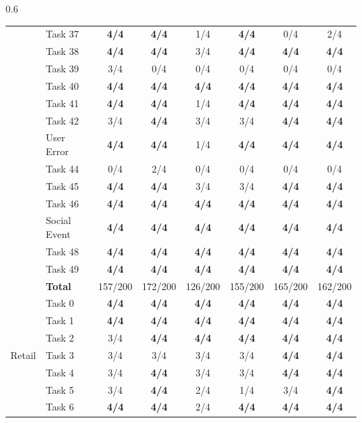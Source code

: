 \begin{table}[t]
\begin{subtable}[t]{0.6\textwidth}
\begin{tabular}{@{}llcccccc@{}}
 & Task 37 & \textbf{4/4} & \textbf{4/4} & 1/4 & \textbf{4/4} & 0/4 & 2/4 \\
 & Task 38 & \textbf{4/4} & \textbf{4/4} & 3/4 & \textbf{4/4} & \textbf{4/4} & \textbf{4/4} \\
 & Task 39 & 3/4 & 0/4 & 0/4 & 0/4 & 0/4 & 0/4 \\
 & Task 40 & \textbf{4/4} & \textbf{4/4} & \textbf{4/4} & \textbf{4/4} & \textbf{4/4} & \textbf{4/4} \\
 & Task 41 & \textbf{4/4} & \textbf{4/4} & 1/4 & \textbf{4/4} & \textbf{4/4} & \textbf{4/4} \\
 & Task 42 & 3/4 & \textbf{4/4} & 3/4 & 3/4 & \textbf{4/4} & \textbf{4/4} \\
 & User Error & \textbf{4/4} & \textbf{4/4} & 1/4 & \textbf{4/4} & \textbf{4/4} & \textbf{4/4} \\
 & Task 44 & 0/4 & 2/4 & 0/4 & 0/4 & 0/4 & 0/4 \\
 & Task 45 & \textbf{4/4} & \textbf{4/4} & 3/4 & 3/4 & \textbf{4/4} & \textbf{4/4} \\
 & Task 46 & \textbf{4/4} & \textbf{4/4} & \textbf{4/4} & \textbf{4/4} & \textbf{4/4} & \textbf{4/4} \\
 & Social Event & \textbf{4/4} & \textbf{4/4} & \textbf{4/4} & \textbf{4/4} & \textbf{4/4} & \textbf{4/4} \\
 & Task 48 & \textbf{4/4} & \textbf{4/4} & \textbf{4/4} & \textbf{4/4} & \textbf{4/4} & \textbf{4/4} \\
 & Task 49 & \textbf{4/4} & \textbf{4/4} & \textbf{4/4} & \textbf{4/4} & \textbf{4/4} & \textbf{4/4} \\
 & \textbf{Total} & 157/200 & 172/200 & 126/200 & 155/200 & 165/200 & 162/200 \\
\midrule
\multirow{115}{*}{Retail} & Task 0 & \textbf{4/4} & \textbf{4/4} & \textbf{4/4} & \textbf{4/4} & \textbf{4/4} & \textbf{4/4} \\
 & Task 1 & \textbf{4/4} & \textbf{4/4} & \textbf{4/4} & \textbf{4/4} & \textbf{4/4} & \textbf{4/4} \\
 & Task 2 & 3/4 & \textbf{4/4} & \textbf{4/4} & \textbf{4/4} & \textbf{4/4} & \textbf{4/4} \\
 & Task 3 & 3/4 & 3/4 & 3/4 & 3/4 & \textbf{4/4} & \textbf{4/4} \\
 & Task 4 & 3/4 & \textbf{4/4} & 3/4 & 3/4 & \textbf{4/4} & \textbf{4/4} \\
 & Task 5 & 3/4 & \textbf{4/4} & 2/4 & 1/4 & 3/4 & \textbf{4/4} \\
 & Task 6 & \textbf{4/4} & \textbf{4/4} & 2/4 & \textbf{4/4} & \textbf{4/4} & \textbf{4/4} \\

\end{tabular}
\end{subtable}
\end{table}
